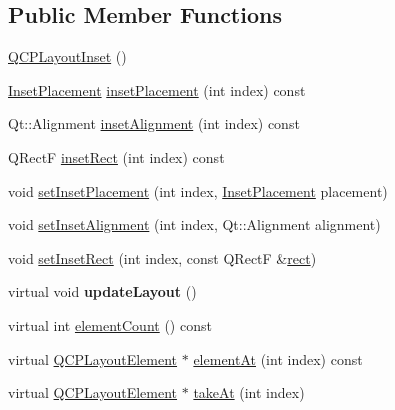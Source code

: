 \subsection*{Public Member Functions}
\begin{DoxyCompactItemize}
\item 
\mbox{\hyperlink{class_q_c_p_layout_inset_a3ad984f3221735374cc5dee14356a7dd}{Q\+C\+P\+Layout\+Inset}} ()
\item 
\mbox{\hyperlink{class_q_c_p_layout_inset_a8b9e17d9a2768293d2a7d72f5e298192}{Inset\+Placement}} \mbox{\hyperlink{class_q_c_p_layout_inset_a6fcbd74ebbc45bfe64c604b2791aa57f}{inset\+Placement}} (int index) const
\item 
Qt\+::\+Alignment \mbox{\hyperlink{class_q_c_p_layout_inset_a5b33b66f0abbb4a7cc2f8aa6c94cf7f8}{inset\+Alignment}} (int index) const
\item 
Q\+RectF \mbox{\hyperlink{class_q_c_p_layout_inset_ab23099a46af17c31f4c40668f13c9de1}{inset\+Rect}} (int index) const
\item 
void \mbox{\hyperlink{class_q_c_p_layout_inset_a63298830744d5d8c5345511c00fd2144}{set\+Inset\+Placement}} (int index, \mbox{\hyperlink{class_q_c_p_layout_inset_a8b9e17d9a2768293d2a7d72f5e298192}{Inset\+Placement}} placement)
\item 
void \mbox{\hyperlink{class_q_c_p_layout_inset_a62882a4f9ad58bb0f53da12fde022abe}{set\+Inset\+Alignment}} (int index, Qt\+::\+Alignment alignment)
\item 
void \mbox{\hyperlink{class_q_c_p_layout_inset_aa487c8378a6f9533567a2e6430099dc3}{set\+Inset\+Rect}} (int index, const Q\+RectF \&\mbox{\hyperlink{class_q_c_p_layout_element_a208effccfe2cca4a0eaf9393e60f2dd4}{rect}})
\item 
\mbox{\label{class_q_c_p_layout_inset_a7b33fdd51b18e6db7cea9bfb2d263b4a}} 
virtual void {\bfseries update\+Layout} ()
\item 
virtual int \mbox{\hyperlink{class_q_c_p_layout_inset_a0398918a888fa7974a6776dc47fc5d2e}{element\+Count}} () const
\item 
virtual \mbox{\hyperlink{class_q_c_p_layout_element}{Q\+C\+P\+Layout\+Element}} $\ast$ \mbox{\hyperlink{class_q_c_p_layout_inset_a832e049f0bb32e7db0490a9c904098df}{element\+At}} (int index) const
\item 
virtual \mbox{\hyperlink{class_q_c_p_layout_element}{Q\+C\+P\+Layout\+Element}} $\ast$ \mbox{\hyperlink{class_q_c_p_layout_inset_ad6756a3b507e20496aaf7f5ca16c47d1}{take\+At}} (int index)

\end{DoxyCompactItemize}
